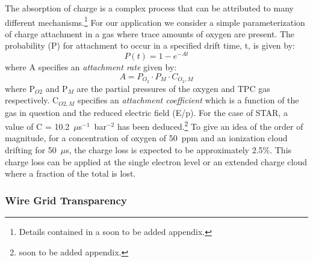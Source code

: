 \documentclass[twoside]{article}
\begin{document}
The absorption of charge is a complex process that
can be attributed to many different mechanisms.\footnote{Details
  contained in a soon to be added appendix.}
For our application we consider a simple parameterization of charge
attachment in a gas where trace amounts of oxygen are present.  The
probability (P) for attachment to occur in a specified drift time, t,
is given by:        
\begin{equation}
             P(t) = 1 - e^{-At}
\label{eq:attach}
\end{equation}
where A specifies an {\em attachment rate} given by:
\begin{equation}
            A = P_{O_{2}} \cdot P_{M} \cdot C_{O_{2},M}
\label{eq:attachrate}
\end{equation}
where P$_{O2}$ and P$_{M}$ are the partial
pressures of the oxygen and TPC gas respectively.
C$_{O2,M}$ specifies an {\em attachment coefficient} which
is a function of the gas in question and the reduced electric field (E/p).
For the case of STAR, a value of C = 10.2~$\mu$s$^{-1}$~bar$^{-2}$
has been deduced.\footnote{soon to be added appendix.}
To give an idea of the order of magnitude, for a concentration
of oxygen of 50~ppm and an ionization cloud drifting for
50~$\mu$s, the charge loss is expected to be approximately 2.5\%.
This charge loss can be applied at the single electron level or
an extended charge cloud where a fraction of the total is lost.

\subsubsection{Wire Grid Transparency}
        
\end{document}
